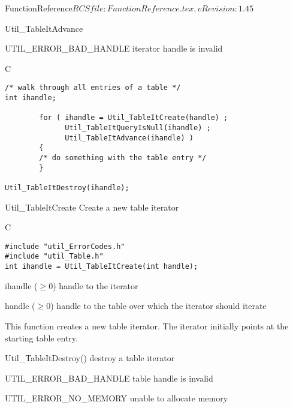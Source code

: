 \begin{cactuspart}{5}{FunctionReference}{$RCSfile: FunctionReference.tex,v $}{$Revision: 1.45 $}
\begin{FunctionDescription}{Util\_TableItAdvance}
\begin{Error}{UTIL\_ERROR\_BAD\_HANDLE}
iterator handle is invalid
\end{Error}

\begin{Example}{C}
\begin{verbatim}
/* walk through all entries of a table */
int ihandle;

        for ( ihandle = Util_TableItCreate(handle) ;
              Util_TableItQueryIsNull(ihandle) ;
              Util_TableItAdvance(ihandle) )
        {
        /* do something with the table entry */
        }

Util_TableItDestroy(ihandle);
\end{verbatim}
\end{Example}
\end{FunctionDescription}


\begin{FunctionDescription}{Util\_TableItCreate}
\label{Util-TableItCreate}
Create a new table iterator

\begin{Synopsis}{C}
\begin{verbatim}
#include "util_ErrorCodes.h"
#include "util_Table.h"
int ihandle = Util_TableItCreate(int handle);
\end{verbatim}
\end{Synopsis}

\begin{Result}{ihandle ($\ge 0$)}
handle to the iterator
\end{Result}

\begin{Parameter}{handle ($\ge 0$)}
handle to the table over which the iterator should iterate
\end{Parameter}

\begin{Discussion}
This function creates a new table iterator.  The iterator initially
points at the starting table entry.
\end{Discussion}

\begin{SeeAlso}{Util\_TableItDestroy()}
destroy a table iterator
\end{SeeAlso}

\begin{Error}{UTIL\_ERROR\_BAD\_HANDLE}
table handle is invalid
\end{Error}
\begin{Error}{UTIL\_ERROR\_NO\_MEMORY}
unable to allocate memory
\end{Error}


\end{FunctionDescription}
\end{cactuspart}

